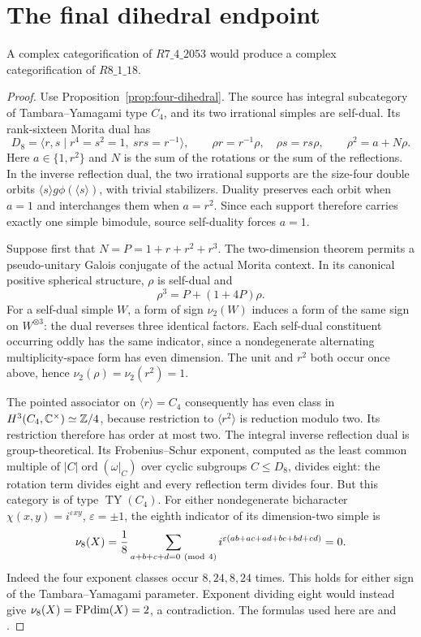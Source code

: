 \section{The final dihedral endpoint}
\label{sec:r2053-endpoint}

\begin{proposition}\label{prop:r2053-r18-reduction}
A complex categorification of $R7\_4\_2053$ would produce a complex
categorification of $R8\_1\_18$.
\end{proposition}
\begin{proof}
Use Proposition~\ref{prop:four-dihedral}. The source has integral
subcategory of Tambara--Yamagami type $C_4$, and its two irrational
simples are self-dual. Its rank-sixteen Morita dual has
\[
 D_8=\langle r,s\mid r^4=s^2=1,\ srs=r^{-1}\rangle,
 \qquad \rho r=r^{-1}\rho,\quad \rho s=rs\rho,
 \qquad \rho^2=a+N\rho.
\]
Here $a\in\{1,r^2\}$ and $N$ is the sum of the rotations or the sum
of the reflections. In the inverse reflection dual, the two irrational
supports are the size-four double orbits
$\langle s\rangle g\phi(\langle s\rangle)$, with trivial stabilizers.
Duality preserves each orbit when $a=1$ and interchanges them when
$a=r^2$. Since each support therefore carries exactly one simple
bimodule, source self-duality forces $a=1$.

Suppose first that $N=P=1+r+r^2+r^3$. The two-dimension theorem
\cite[Lemma~3.1]{Schopieray} permits a pseudo-unitary Galois conjugate
of the actual Morita context. In its canonical positive spherical
structure, $\rho$ is self-dual and
\[
 \rho^3=P+(1+4P)\rho.
\]
For a self-dual simple $W$, a form of sign $\nu_2(W)$ induces a form
of the same sign on $W^{\otimes3}$: the dual reverses three identical
factors. Each self-dual constituent occurring oddly has the same
indicator, since a nondegenerate alternating multiplicity-space form
has even dimension. The unit and $r^2$ both occur once above, hence
$\nu_2(\rho)=\nu_2(r^2)=1$.

The pointed associator on $\langle r\rangle=C_4$ consequently has
even class in $H^3(C_4,\mathbb C^\times)\simeq\mathbb Z/4$, because restriction
to $\langle r^2\rangle$ is reduction modulo two. Its restriction
therefore has order at most two. The integral inverse reflection dual
is group-theoretical. Its Frobenius--Schur exponent, computed as the
least common multiple of
$|C|\operatorname{ord}(\omega|_C)$ over cyclic subgroups $C\leq D_8$,
divides eight: the rotation term divides eight and every reflection
term divides four. But this category is of type $\operatorname{TY}(C_4)$.
For either nondegenerate bicharacter
$\chi(x,y)=i^{\varepsilon xy}$, $\varepsilon=\pm1$, the eighth
indicator of its dimension-two simple is
\[
 \nu_8(X)=\frac18
 \sum_{a+b+c+d=0\ ({\rm mod}\ 4)}
 i^{\varepsilon(ab+ac+ad+bc+bd+cd)}=0.
\]
Indeed the four exponent classes occur $8,24,8,24$ times. This holds
for either sign of the Tambara--Yamagami parameter. Exponent dividing
eight would instead give $\nu_8(X)=\operatorname{FPdim}(X)=2$, a contradiction.
The formulas used here are \cite[Theorem~9.2]{NgSchauenburgExponent}
and \cite[Theorem~3.4]{ShimizuTY}.


\end{proof}
